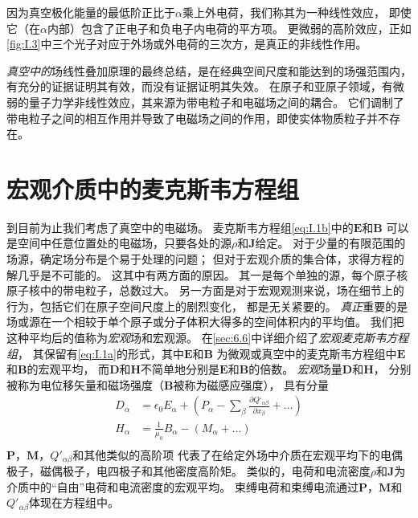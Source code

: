 \documentclass[12pt]{book}
\numberwithin{equation}{chapter}
\numberwithin{figure}{chapter}
\numberwithin{footnote}{page}
\begin{document}
因为真空极化能量的最低阶正比于$\alpha$乘上外电荷，我们称其为一种线性效应，
即使它（在$\alpha$内部）包含了正电子和负电子内电荷的平方项。
更微弱的高阶效应，正如\autoref{fig:I.3}中三个光子对应于外场或外电荷的三次方，是真正的非线性作用。

\textit{真空中的}场线性叠加原理的最终总结，是在经典空间尺度和能达到的场强范围内，
有充分的证据证明其有效，而没有证据证明其失效。
在原子和亚原子领域，有微弱的量子力学非线性效应，其来源为带电粒子和电磁场之间的耦合。
它们调制了带电粒子之间的相互作用并导致了电磁场之间的作用，即使实体物质粒子并不存在。

\section{宏观介质中的麦克斯韦方程组}\label{sec:I.4}

到目前为止我们考虑了真空中的电磁场。
麦克斯韦方程组\autoref{eq:I.1b}中的$\mathbf{E}$和$\mathbf{B}$
可以是空间中任意位置处的电磁场，只要各处的源$\rho$和$\mathbf{J}$给定。
对于少量的有限范围的场源，确定场分布是个易于处理的问题；
但对于宏观介质的集合体，求得方程的解几乎是不可能的。
这其中有两方面的原因。
其一是每个单独的源，每个原子核原子核中的带电粒子，总数过大。
另一方面是对于宏观观测来说，场在细节上的行为，包括它们在原子空间尺度上的剧烈变化，
都是无关紧要的。
\textit{真正}重要的是场或源在一个相较于单个原子或分子体积大得多的空间体积内的平均值。
我们把这种平均后的值称为\textit{宏观}场和宏观源。
在\autoref{sec:6.6}中详细介绍了\textit{宏观麦克斯韦方程组}，
其保留有\autoref{eq:I.1a}的形式，其中$\mathbf{E}$和$\mathbf{B}$
为微观或真空中的麦克斯韦方程组中$\mathbf{E}$和$\mathbf{B}$的宏观平均，
而$\mathbf{D}$和$\mathbf{H}$不简单地分别是$\mathbf{E}$和$\mathbf{B}$的倍数。
\textit{宏观}场量$\mathbf{D}$和$\mathbf{H}$，
分别被称为电位移矢量和磁场强度（$\mathbf{B}$被称为磁感应强度），
具有分量
\begin{equation}\label{eq:I.9}
\begin{aligned}
D_{\alpha}&=\epsilon_0 E_{\alpha}+(P_{\alpha}-\sum_{\beta}\frac{\partial Q‘_{\alpha\beta}}{\partial x_{\beta}}+\dots)\\
H_{\alpha}&=\frac{1}{\mu_0}B_{\alpha}-(M_{\alpha}+\dots)\\
\end{aligned}
\end{equation}
$\mathbf{P}$，$\mathbf{M}$，$Q'_{\alpha\beta}$和其他类似的高阶项
代表了在给定外场中介质在宏观平均下的电偶极子，磁偶极子，电四极子和其他密度高阶矩。
类似的，电荷和电流密度$\rho$和$\mathbf{J}$为介质中的“自由”电荷和电流密度的宏观平均。
束缚电荷和束缚电流通过$\mathbf{P}$，$\mathbf{M}$和$Q'_{\alpha\beta}$体现在方程组中。
\end{document}
